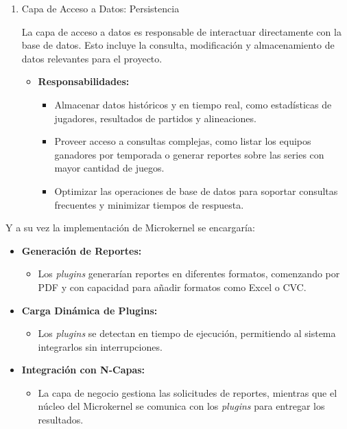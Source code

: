 \documentclass{report}
\begin{document}
\begin{enumerate}
        \item Capa de Acceso a Datos: Persistencia
        
        La capa de acceso a datos es responsable de interactuar directamente con la base de datos. Esto incluye la 
        consulta, modificación y almacenamiento de datos relevantes para el proyecto.
        
        \begin{itemize}
            \item \textbf{Responsabilidades:}
            \begin{itemize}
                \item Almacenar datos históricos y en tiempo real, como estadísticas de jugadores, resultados de 
                partidos y alineaciones.
                \item Proveer acceso a consultas complejas, como listar los equipos ganadores por temporada o generar 
                reportes sobre las series con mayor cantidad de juegos.
                \item Optimizar las operaciones de base de datos para soportar consultas frecuentes y minimizar 
                tiempos de respuesta.
            \end{itemize}
        \end{itemize}
    \end{enumerate}

    Y a su vez la implementación de Microkernel se encargaría:

    \begin{itemize}
        \item \textbf{Generación de Reportes:}
        \begin{itemize}
            \item Los \textit{plugins} generarían reportes en diferentes formatos, comenzando por PDF y con capacidad para añadir formatos como Excel o CVC.
        \end{itemize}

        \item \textbf{Carga Dinámica de Plugins:}
        \begin{itemize}
            \item Los \textit{plugins} se detectan en tiempo de ejecución, permitiendo al sistema integrarlos sin interrupciones.
        \end{itemize}

        \item \textbf{Integración con N-Capas:}
        \begin{itemize}
            \item La capa de negocio gestiona las solicitudes de reportes, mientras que el núcleo del Microkernel se comunica con los \textit{plugins} para entregar los resultados.
        \end{itemize}
    \end{itemize}
\end{document}
